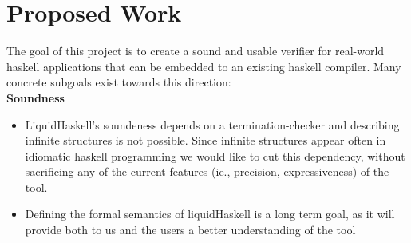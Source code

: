 \section*{Proposed Work}

The goal of this project is to create a sound and usable verifier
for real-world haskell applications that can be embedded to an
existing haskell compiler.
%
Many concrete subgoals exist towards this direction: \\

\textbf{Soundness}
\begin{itemize}
\item
LiquidHaskell's soundeness
depends on a termination-checker and
describing infinite structures is not possible.
%
Since infinite structures appear often in 
idiomatic haskell programming
we would like to cut this dependency, 
without sacrificing any of the current 
features (ie., precision, expressiveness) of the tool.



\item 
Defining the formal semantics of liquidHaskell
is a long term goal, 
as it will provide both to us and the users 
a better understanding of the tool
\end{itemize}



